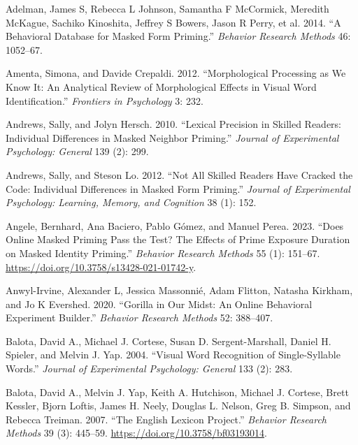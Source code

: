 \documentclass[
]{interact}
\newlength{\cslhangindent}
\newenvironment{CSLReferences}[2] %
 {\begin{list}{}{%
  \setlength{\itemindent}{0pt}
  \setlength{\leftmargin}{0pt}
  \setlength{\parsep}{0pt}
  \ifodd #1
   \setlength{\leftmargin}{\cslhangindent}
   \setlength{\itemindent}{-1\cslhangindent}
  \fi
  \setlength{\itemsep}{#2\baselineskip}}}
 {\end{list}}
\begin{document}
\label{refs}
\begin{CSLReferences}{1}{0}
Adelman, James S, Rebecca L Johnson, Samantha F McCormick, Meredith
McKague, Sachiko Kinoshita, Jeffrey S Bowers, Jason R Perry, et al.
2014. {``A Behavioral Database for Masked Form Priming.''}
\emph{Behavior Research Methods} 46: 1052--67.

Amenta, Simona, and Davide Crepaldi. 2012. {``Morphological Processing
as We Know It: An Analytical Review of Morphological Effects in Visual
Word Identification.''} \emph{Frontiers in Psychology} 3: 232.

Andrews, Sally, and Jolyn Hersch. 2010. {``Lexical Precision in Skilled
Readers: Individual Differences in Masked Neighbor Priming.''}
\emph{Journal of Experimental Psychology: General} 139 (2): 299.

Andrews, Sally, and Steson Lo. 2012. {``Not All Skilled Readers Have
Cracked the Code: Individual Differences in Masked Form Priming.''}
\emph{Journal of Experimental Psychology: Learning, Memory, and
Cognition} 38 (1): 152.

Angele, Bernhard, Ana Baciero, Pablo Gómez, and Manuel Perea. 2023.
{``Does Online Masked Priming Pass the Test? The Effects of Prime
Exposure Duration on Masked Identity Priming.''} \emph{Behavior Research
Methods} 55 (1): 151--67.
\url{https://doi.org/10.3758/s13428-021-01742-y}.

Anwyl-Irvine, Alexander L, Jessica Massonnié, Adam Flitton, Natasha
Kirkham, and Jo K Evershed. 2020. {``Gorilla in Our Midst: An Online
Behavioral Experiment Builder.''} \emph{Behavior Research Methods} 52:
388--407.

Balota, David A., Michael J. Cortese, Susan D. Sergent-Marshall, Daniel
H. Spieler, and Melvin J. Yap. 2004. {``Visual Word Recognition of
Single-Syllable Words.''} \emph{Journal of Experimental Psychology:
General} 133 (2): 283.

Balota, David A., Melvin J. Yap, Keith A. Hutchison, Michael J. Cortese,
Brett Kessler, Bjorn Loftis, James H. Neely, Douglas L. Nelson, Greg B.
Simpson, and Rebecca Treiman. 2007. {``The English Lexicon Project.''}
\emph{Behavior Research Methods} 39 (3): 445--59.
\url{https://doi.org/10.3758/bf03193014}.


\end{CSLReferences}
\end{document}
